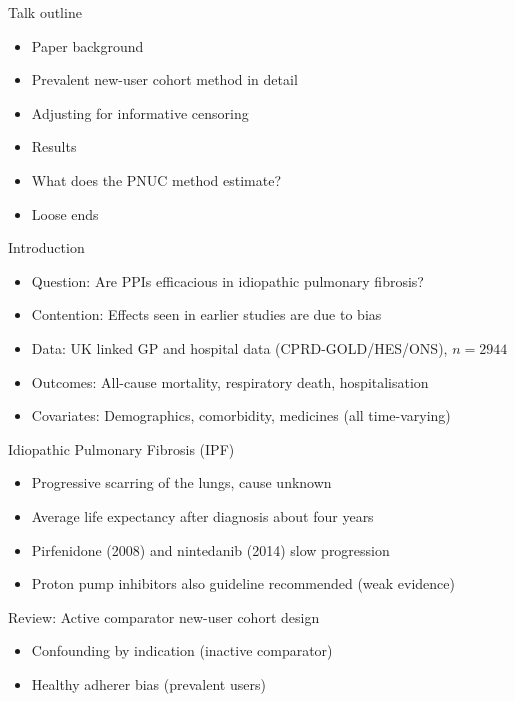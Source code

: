 \documentclass[aspectratio=169,12pt]{beamer} %
\begin{document}

\begin{frame}{Talk outline}
    \begin{itemize}
	\item Paper background
	\item Prevalent new-user cohort method in detail
	\item Adjusting for informative censoring
	\item Results
	\item What does the PNUC method estimate?
	\item Loose ends
    \end{itemize}
\end{frame}

\begin{frame}{Introduction}
    \begin{itemize}
	\item Question: Are PPIs efficacious in idiopathic pulmonary fibrosis?
	\item Contention: Effects seen in earlier studies are due to bias
	\item Data: UK linked GP and hospital data (CPRD-GOLD/HES/ONS), $n=2944$
	\item Outcomes: All-cause mortality, respiratory death, hospitalisation
	\item Covariates: Demographics, comorbidity, medicines (all time-varying)
    \end{itemize}
\end{frame}

\begin{frame}{Idiopathic Pulmonary Fibrosis (IPF)}
    \begin{itemize}
        \item Progressive scarring of the lungs, cause unknown
	\item Average life expectancy after diagnosis about four years
	\item Pirfenidone (2008) and nintedanib (2014) slow progression
	\item Proton pump inhibitors also guideline recommended (weak evidence)
    \end{itemize}
\end{frame}

\begin{frame}{Review: Active comparator new-user cohort design}
    \begin{itemize}
	\item Confounding by indication (inactive comparator)
	\item Healthy adherer bias (prevalent users)
    \end{itemize}
\end{frame}
\end{document}

